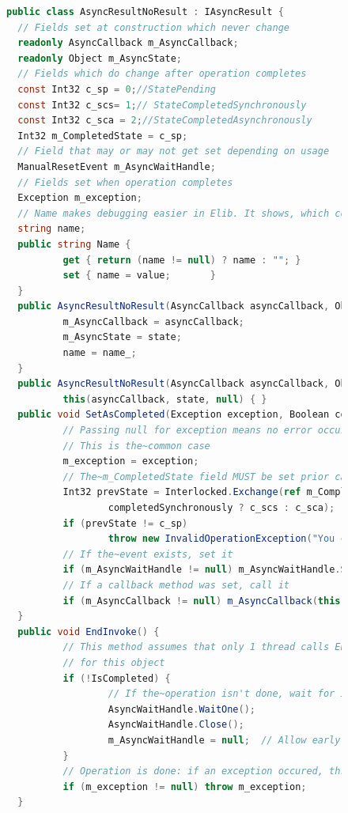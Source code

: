 \begin{figure}[!hbp]	
\begin{lstlisting}[language=cs]
public class AsyncResultNoResult : IAsyncResult {
  // Fields set at construction which never change 
  readonly AsyncCallback m_AsyncCallback;
  readonly Object m_AsyncState;
  // Fields which do change after operation completes
  const Int32 c_sp = 0;//StatePending
  const Int32 c_scs= 1;// StateCompletedSynchronously
  const Int32 c_sca = 2;//StateCompletedAsynchronously
  Int32 m_CompletedState = c_sp;
  // Field that may or may not get set depending on usage
  ManualResetEvent m_AsyncWaitHandle;
  // Fields set when operation completes
  Exception m_exception;
  // Name makes debugging easier in Elib. It shows, which command was used.
  string name;
  public string Name { 
          get { return (name != null) ? name : ""; } 
          set { name = value; 		} 
  }
  public AsyncResultNoResult(AsyncCallback asyncCallback, Object state, string name_) {
          m_AsyncCallback = asyncCallback;
          m_AsyncState = state;
          name = name_;
  }
  public AsyncResultNoResult(AsyncCallback asyncCallback, Object state) : 
          this(asyncCallback, state, null) { }
  public void SetAsCompleted(Exception exception, Boolean completedSynchronously) {
          // Passing null for exception means no error occurred. 
          // This is the~common case
          m_exception = exception;
          // The~m_CompletedState field MUST be set prior calling the~callback
          Int32 prevState = Interlocked.Exchange(ref m_CompletedState, 
                  completedSynchronously ? c_scs : c_sca);
          if (prevState != c_sp)
                  throw new InvalidOperationException("You can set a result only once");
          // If the~event exists, set it
          if (m_AsyncWaitHandle != null) m_AsyncWaitHandle.Set();
          // If a callback method was set, call it
          if (m_AsyncCallback != null) m_AsyncCallback(this);
  }
  public void EndInvoke() {
          // This method assumes that only 1 thread calls EndInvoke 
          // for this object
          if (!IsCompleted) {
                  // If the~operation isn't done, wait for it
                  AsyncWaitHandle.WaitOne();
                  AsyncWaitHandle.Close();
                  m_AsyncWaitHandle = null;  // Allow early GC
          }      
          // Operation is done: if an exception occured, throw it
          if (m_exception != null) throw m_exception;
  }


\end{lstlisting}
\end{figure}
